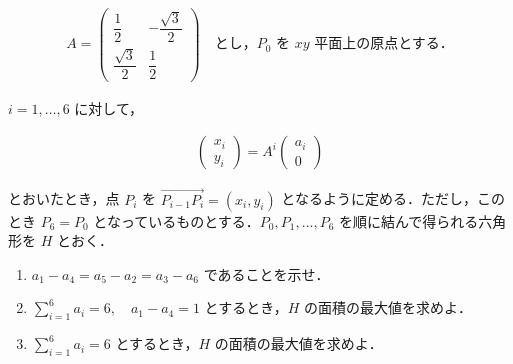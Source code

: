 \documentclass[../../main.tex]{subfiles}
\begin{document}
\begin{align}
  A =
  \begin{pmatrix}
    \dfrac{1}{2}        & -\dfrac{\sqrt{3}}{2} \\
    \dfrac{\sqrt{3}}{2} & \dfrac{1}{2}
  \end{pmatrix}
  \quad \text{とし，} P_0 \text{ を } xy \text{ 平面上の原点とする．}
\end{align}

$i = 1, \dots, 6$ に対して，

\begin{align}
  \begin{pmatrix}
    x_i \\
    y_i
  \end{pmatrix}
  = A^i
  \begin{pmatrix}
    a_i \\
    0
  \end{pmatrix}
\end{align}

とおいたとき，点 $P_i$ を $\overrightarrow{P_{i-1}P_i} = (x_i, y_i)$ となるように定める．ただし，このとき $P_6 = P_0$ となっているものとする．$P_0, P_1, \dots, P_6$ を順に結んで得られる六角形を $H$ とおく．

\begin{enumerate}
  \item[(1)] $a_1 - a_4 = a_5 - a_2 = a_3 - a_6$ であることを示せ．
  \item[(2)] $\sum_{i=1}^6 a_i = 6,\quad a_1 - a_4 = 1$ とするとき，$H$ の面積の最大値を求めよ．
  \item[(3)] $\sum_{i=1}^6 a_i = 6$ とするとき，$H$ の面積の最大値を求めよ．
\end{enumerate}
\end{document}
